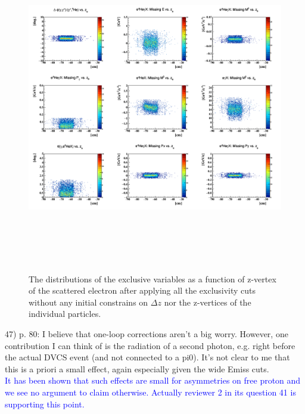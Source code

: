  \begin{figure}[tbp]
 \centering
 \includegraphics[height=14.5cm]{fig/exclusivity_zele.png}
 \caption{The distributions of the exclusive variables as a function of 
 z-vertex of the scattered electron after applying all the exclusivity cuts 
 without any initial constrains on $\Delta z$ nor the z-vertices of the 
 individual particles.}
 \label{fig:exclusive_z}
 \end{figure}


47) p. 80: I believe that one-loop corrections aren't a big worry. However, one 
contribution I can think of is the radiation of a second photon, e.g. right 
before the actual DVCS event (and not connected to a pi0). It's not clear to me 
that this is a priori a small effect, again especially given the wide Emiss 
cuts. \\
\textcolor{blue}{It has been shown that such effects are small for asymmetries
on free proton and we see no argument to claim otherwise. Actually reviewer 2
in its question 41 is supporting this point.}\\

